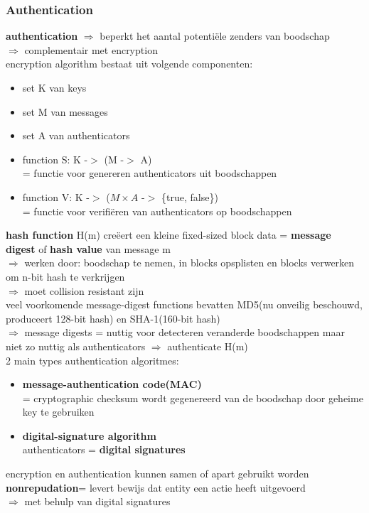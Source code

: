 \documentclass{report}
\begin{document}
\subsubsection{Authentication}
\textbf{authentication} $\Rightarrow$ beperkt het aantal potenti\"ele zenders van boodschap
\\$\Rightarrow$ complementair met encryption
\\encryption algorithm bestaat uit volgende componenten:
\begin{itemize}
\item set K van keys
\item set M van messages
\item set A van authenticators
\item function S: K -$>$ (M -$>$ A)
\\= functie voor genereren authenticators uit boodschappen
\item function V: K -$>$ ($M \times A$ -$>$ \{true, false\})
\\= functie voor verifi\"eren van authenticators op boodschappen
\end{itemize}
\textbf{hash function} H(m) cre\"eert een kleine fixed-sized block data = \textbf{message digest} of \textbf{hash value} van message m
\\$\Rightarrow$ werken door: boodschap te nemen, in blocks opsplisten en blocks verwerken om n-bit hash te verkrijgen
\\$\Rightarrow$ moet collision resistant zijn
\\veel voorkomende message-digest functions bevatten MD5(nu onveilig beschouwd, produceert 128-bit hash) en SHA-1(160-bit hash)
\\$\Rightarrow$ message digests = nuttig voor detecteren veranderde boodschappen maar niet zo nuttig als authenticators $\Rightarrow$ authenticate H(m)
\\2 main types authentication algoritmes:
\begin{itemize}
\item \textbf{message-authentication code(MAC)}
\\= cryptographic checksum wordt gegenereerd van de boodschap door geheime key te gebruiken
\item \textbf{digital-signature algorithm}
\\authenticators = \textbf{digital signatures}

\end{itemize}
encryption en authentication kunnen samen of apart gebruikt worden
\\\textbf{nonrepudation}= levert bewijs dat entity een actie heeft uitgevoerd
\\$\Rightarrow$ met behulp van digital signatures
\end{document}
